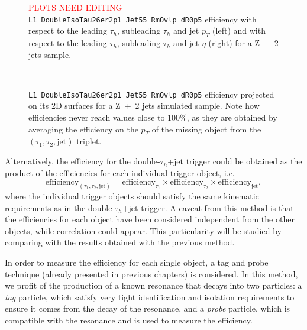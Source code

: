 \documentclass[../main.tex]{subfiles}
\begin{document}
\begin{figure}[h!]
\begin{center}
\end{center}
\caption{\textcolor{red}{PLOTS NEED EDITING} \texttt{L1\_DoubleIsoTau26er2p1\_Jet55\_RmOvlp\_dR0p5} efficiency with respect to the leading $\tau_h$, subleading $\tau_h$ and jet $p_T$  (left) and with respect to the leading $\tau_h$, subleading $\tau_h$ and jet $\eta$  (right) for a Z~+~2 jets sample.}
\label{hh:fig:l1_3d_eff}
\end{figure}

\begin{figure}[h!]
\begin{center}
 \\
\end{center}
\caption{\texttt{L1\_DoubleIsoTau26er2p1\_Jet55\_RmOvlp\_dR0p5} efficiency projected on its 2D surfaces for a Z~+~2 jets simulated sample. Note how efficiencies never reach values close to 100\%, as they are obtained by averaging the efficiency on the $p_T$ of the missing object from the $(\tau_1, \tau_2, \text{jet})$ triplet.}
\label{hh:fig:l1_2d_eff}
\end{figure}

Alternatively, the efficiency for the double-$\tau_h$+jet trigger could be obtained as the product of the efficiencies for each individual trigger object, i.e.
\begin{equation}
\label{hh:eq:eff_per_legs}
\text{efficiency}_{(\tau_1,\tau_2,\text{jet})} = \text{efficiency}_{\tau_1}\times\text{efficiency}_{\tau_2}\times\text{efficiency}_{\text{jet}},
\end{equation}
where the individual trigger objects should satisfy the same kinematic requirements as in the double-$\tau_h$+jet trigger. A caveat from this method is that the efficiencies for each object have been considered independent from the other objects, while correlation could appear. This particularity will be studied by comparing with the results obtained with the previous method.

In order to measure the efficiency for each single object, a tag and probe technique (already presented in previous chapters) is considered. In this method, we profit of the production of a known resonance that decays into two particles: a \textit{tag} particle, which satisfy very tight identification and isolation requirements to ensure it comes from the decay of the resonance, and a \textit{probe} particle, which is compatible with the resonance and is used to measure the efficiency.
\end{document}
